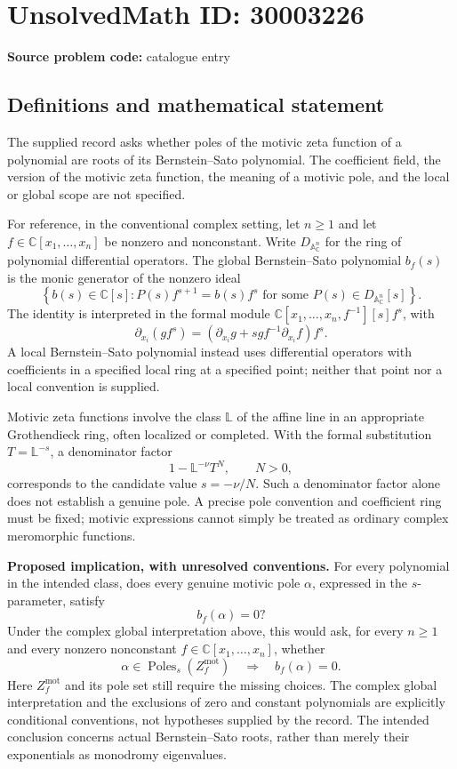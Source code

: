 \documentclass[11pt]{article}
\newcommand{\C}{\mathbb{C}}
\newcommand{\A}{\mathbb{A}}
\begin{document}
\section*{UnsolvedMath ID: 30003226}
\textbf{Source problem code:} catalogue entry
\subsection{Definitions and mathematical statement}
The supplied record asks whether poles of the motivic zeta function of a polynomial are roots of its Bernstein--Sato polynomial. The coefficient field, the version of the motivic zeta function, the meaning of a motivic pole, and the local or global scope are not specified.

For reference, in the conventional complex setting, let \(n\geq 1\) and let \(f\in\C[x_1,\ldots,x_n]\) be nonzero and nonconstant. Write \(D_{\A^n_{\C}}\) for the ring of polynomial differential operators. The global Bernstein--Sato polynomial \(b_f(s)\) is the monic generator of the nonzero ideal
\[
\left\{b(s)\in\C[s]: P(s)f^{s+1}=b(s)f^s\text{ for some }P(s)\in D_{\A^n_{\C}}[s]\right\}.
\]
The identity is interpreted in the formal module \(\C[x_1,\ldots,x_n,f^{-1}][s]f^s\), with
\[
\partial_{x_i}(g f^s)=\left(\partial_{x_i}g+s g f^{-1}\partial_{x_i}f\right)f^s.
\]
A local Bernstein--Sato polynomial instead uses differential operators with coefficients in a specified local ring at a specified point; neither that point nor a local convention is supplied.

Motivic zeta functions involve the class \(\mathbb L\) of the affine line in an appropriate Grothendieck ring, often localized or completed. With the formal substitution \(T=\mathbb L^{-s}\), a denominator factor
\[
1-\mathbb L^{-\nu}T^N,\qquad N>0,
\]
corresponds to the candidate value \(s=-\nu/N\). Such a denominator factor alone does not establish a genuine pole. A precise pole convention and coefficient ring must be fixed; motivic expressions cannot simply be treated as ordinary complex meromorphic functions.

\textbf{Proposed implication, with unresolved conventions.} For every polynomial in the intended class, does every genuine motivic pole \(\alpha\), expressed in the \(s\)-parameter, satisfy
\[
b_f(\alpha)=0?
\]
Under the complex global interpretation above, this would ask, for every \(n\geq1\) and every nonzero nonconstant \(f\in\C[x_1,\ldots,x_n]\), whether
\[
\alpha\in\operatorname{Poles}_s(Z_f^{\mathrm{mot}})\quad\Longrightarrow\quad b_f(\alpha)=0.
\]
Here \(Z_f^{\mathrm{mot}}\) and its pole set still require the missing choices. The complex global interpretation and the exclusions of zero and constant polynomials are explicitly conditional conventions, not hypotheses supplied by the record. The intended conclusion concerns actual Bernstein--Sato roots, rather than merely their exponentials as monodromy eigenvalues.
\end{document}
